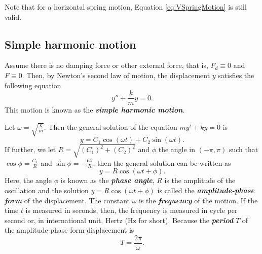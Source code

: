 Note that for a horizontal spring motion, Equation \eqref{eq:VSpringMotion} is still valid.

\subsection{Simple harmonic motion}
Assume there is no damping force or other external force, that is, $F_d\equiv 0$ and $F\equiv 0$. Then, by Newton's second law of motion, the displacement $y$ satisfies the following equation
\[y''+\frac{k}{m}y=0.\]
This motion is known as the \emph{\textbf{simple harmonic motion}}.

Let $\omega=\sqrt{\frac km}$. Then the general solution of the equation $my'+ky=0$ is
\[y=C_1\cos(\omega t)+C_2\sin(\omega t).\]
If further, we let $R=\sqrt{\left(C_1\right)^2+\left(C_2\right)^2}$ and  $\phi$ the angle in $(-\pi,\pi)$ such that $\cos\phi=\frac{C_1}{R}$ and $\sin\phi=-\frac{C_2}{R}$, then the general solution can be written as
\[y=R\cos(\omega t+\phi).\]
Here, the angle $\phi$ is known as the \emph{\textbf{phase angle}},  $R$ is the amplitude of the oscillation and the solution $y=R\cos(\omega t+\phi)$ is called the \emph{\textbf{amplitude-phase form}} of the displacement. The constant $\omega$ is the \emph{\textbf{frequency}} of the motion. If the time $t$ is measured in seconds, then, the frequency is measured in cycle per second or, in international unit, Hertz (Hz for short). Because the \emph{\textbf{period}} $T$ of the amplitude-phase form displacement is 
\[T=\frac{2\pi}{\omega}.\]

